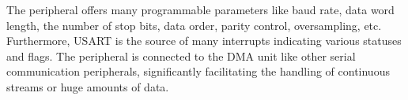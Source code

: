 The peripheral offers many programmable parameters like baud rate, data word length, the number of stop bits, data order, parity control, oversampling, etc. Furthermore, USART is the source of many interrupts indicating various statuses and flags. The peripheral is connected to the DMA unit like other serial communication peripherals, significantly facilitating the handling of continuous streams or huge amounts of data.